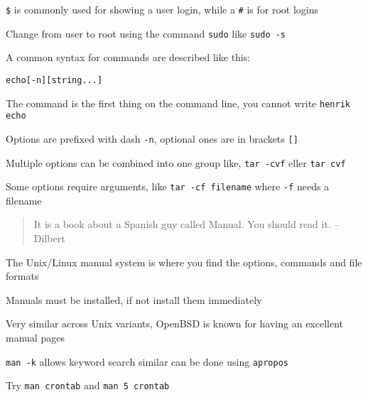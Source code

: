 \documentclass[Screen16to9,17pt]{foils}
\begin{document}
\begin{list1}
\item \verb+$+ is commonly used for showing a user login, while a \verb+#+ is for root logins
\item Change from user to root using the command \verb+sudo+ like \verb+sudo -s+
\end{list1}


A common syntax for commands are described like this:
\begin{alltt}
echo [-n] [string ...]
\end{alltt}

\begin{list2}
\item The command is the first thing on the command line, you cannot write \verb+henrik echo+
\item Options are prefixed with dash \verb+-n+, optional ones are in brackets  \verb+[]+
\item Multiple options can be combined into one group like, \verb+tar -cvf+ eller \verb+tar cvf+
\item Some options require arguments, like \verb+tar -cf filename+ where \verb+-f+ needs a filename
\end{list2}





\begin{quote}
 It is a book about a Spanish guy called Manual. You should read it.
       -- Dilbert
\end{quote}

\begin{list1}
\item The Unix/Linux manual system is where you find the options, commands and file formats
\item Manuals must be installed, if not install them immediately
\item Very similar across Unix variants, OpenBSD is known for having an excellent manual pages
\item \verb+man -k+ allows keyword search similar can be done using \verb+apropos+
\end{list1}

Try \verb+man crontab+ and \verb+man 5 crontab+



\end{document}
